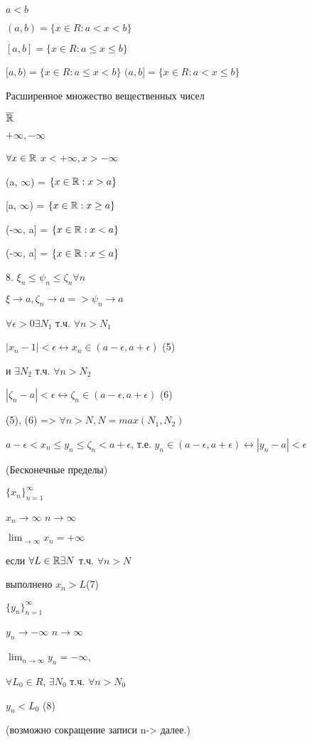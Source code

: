 $a < b$

$(a, b) = \{x \in R: a < x < b\}$

$[a, b] = \{x \in R: a \leq x \leq b\}$

$[a, b) = \{x \in R: a \leq x < b\}$
$(a, b] = \{x \in R: a < x \leq b\}$

Расширенное множество вещественных чисел

$\overline {\mathbb{R}}$

$+ \infty, - \infty$

$\forall x \in \mathbb{R}$ $x < + \infty, x > - \infty$

(a, $\infty$) = $\{x \in \mathbb{R} : x > a\}$

[a, $\infty$) = $\{x \in \mathbb{R} : x \geq a\}$

(-$\infty$, a] = $\{x \in \mathbb{R} : x < a\}$

(-$\infty$, a] = $\{x \in \mathbb{R} : x \leq a\}$

8. $\xi_n \leq \psi_n \leq \zeta_n \forall n$

$\xi \to a, \zeta_n \to a => \psi_n \to a$

$\forall \epsilon > 0 \exists N_1$ т.ч. $\forall n > N_1$

$|x_n - 1| < \epsilon \leftrightarrow x_n \in (a - \epsilon, a + \epsilon)$ (5)

и $\exists N_2$ т.ч. $\forall n > N_2$

$|\zeta_n - a| < \epsilon \leftrightarrow \zeta_n \in (a - \epsilon, a + \epsilon)$ (6)

(5), (6) => $\forall n > N, N = max(N_1, N_2)$

$a - \epsilon < x_n \leq y_n \leq \zeta_n < a + \epsilon$, т.е. $ y_n \in (a - \epsilon, a + \epsilon) \leftrightarrow |y_n - a| < \epsilon$

\begin{definition}(Бесконечные пределы)

    $\{x_n\}_{n=1}^{\infty}$

    $x_n \to \infty$
    $n \to \infty$

    $\lim_{\to \infty} x_n = + \infty$

    если $\forall L \in \mathbb{R} \exists N$ т.ч. $\forall n > N$

    выполнено
    $x_n >L$(7)

    $\{y_n\}_{n=1}^\infty$

    $y_n \to -\infty$
    $n \to \infty$

    $\lim_{n \to \infty} y_n = -\infty$,

    $\forall L_0 \in R$, $\exists N_0$ т.ч. $\forall n > N_0$

    $y_n < L_0$ (8)

    (возможно сокращение записи n-> далее.)


\end{definition}

